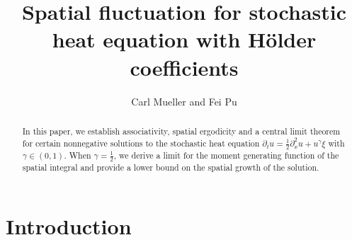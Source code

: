 \documentclass[12pt, reqno]{amsart}
\title[Fluctuation for SHE with H\"older coefficients]{Spatial fluctuation for stochastic heat equation with H\"older  coefficients}
\author{Carl Mueller and Fei Pu}
\date{}                                           %
\newcommand{\<}{\langle}
\renewcommand{\>}{\rangle}
\begin{document}
\newtheorem{stat}{Statement}[section]
\newtheorem{proposition}[stat]{Proposition}
\newtheorem*{prop}{Proposition}
\newtheorem{corollary}[stat]{Corollary}
\newtheorem{theorem}[stat]{Theorem}
\newtheorem{lemma}[stat]{Lemma}
\theoremstyle{definition}
\newtheorem{definition}[stat]{Definition}
\newtheorem*{cremark}{Remark}
\newtheorem{remark}[stat]{Remark}
\newtheorem*{OP}{Open Problem}
\newtheorem{example}[stat]{Example}
\newtheorem{nota}[stat]{Notation}
\maketitle

\begin{abstract}
           In this paper, we establish associativity, spatial ergodicity 
and a central limit theorem for certain nonnegative solutions to
           the stochastic heat equation $\partial_t u=\frac12\partial_x^2 u+ u^\gamma \xi$ with $\gamma\in (0, 1)$.
           When $\gamma=\frac12$, we derive a limit for the moment generating function of the spatial integral 
           and provide a lower bound on the spatial growth of the solution.            
\end{abstract}


		







\section{Introduction}
\end{document}
